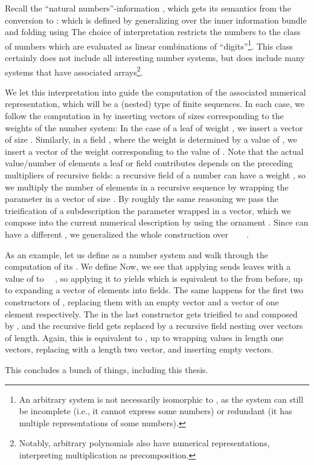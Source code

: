 Recall the ``natural numbers''-information , which gets its semantics from the conversion to \bN{}:
which is defined by generalizing over the inner information bundle and folding using
The choice of interpretation restricts the numbers to the class of numbers which are evaluated as linear combinations of ``digits''\footnote{An arbitrary  system is not necessarily isomorphic to \bN{}, as the system can still be incomplete (i.e., it cannot express some numbers) or redundant (it has multiple representations of some numbers).}. This class certainly does not include all interesting number systems, but does include many systems that have associated arrays\footnote{Notably, arbitrary polynomials also have numerical representations, interpreting multiplication as precomposition.}. 

We let this interpretation into \bN{} guide the computation of the associated numerical representation, which will be a (nested) type of finite sequences. In each case, we follow the computation in  by inserting vectors of sizes corresponding to the weights of the number system:
In the case of a leaf  of weight , we insert a vector of size . Similarly, in a field , where the weight is determined by a value  of , we insert a vector of the weight corresponding to the value of . Note that the actual value/number of elements a leaf or field contributes depends on the preceding multipliers of recursive fields: a recursive field of a number can have a weight , so we multiply the number of elements in a recursive sequence by wrapping the parameter in a vector of size . By roughly the same reasoning we pass the trieification of a subdescription  the parameter wrapped in a vector, which we compose into the current numerical description by using the ornament . Since  can have a different , we generalized the whole construction over \ \AV{:} \ \ .

As an example, let us define  as a number system and walk through the computation of its . We define
Now, we see that applying  sends leaves with a value of  to \ \ , so applying it to  yields
which is equivalent to the  from before, up to expanding a vector of  elements into  fields. The same happens for the first two constructors of , replacing them with an empty vector and a vector of one element respectively. The  in the last constructor gets trieified to  and composed by , and the recursive field gets replaced by a recursive field nesting over vectors of length. Again, this is equivalent to , up to wrapping values in length one vectors, replacing  with a length two vector, and inserting empty vectors.


\begin{outline}
This concludes a bunch of things, including this thesis.
\end{outline}

